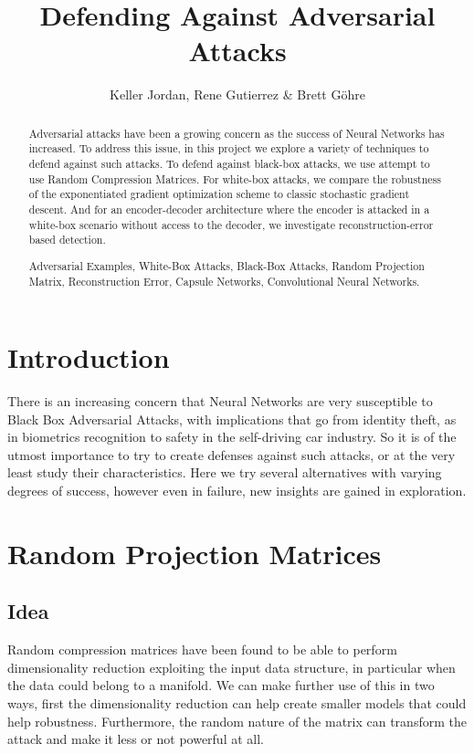 \documentclass{asaproc}
\title{Defending Against Adversarial Attacks}
\author{Keller Jordan, Rene Gutierrez \& Brett G\"{o}hre \\}
\begin{document}
\maketitle


\begin{abstract}

Adversarial attacks have been a growing concern as the success of Neural Networks has increased. To address this issue, in this project we explore a variety of techniques to defend against such attacks. To defend against black-box attacks, we use attempt to use Random Compression Matrices. For white-box attacks, we compare the robustness of the exponentiated gradient optimization scheme to classic stochastic gradient descent. And for an encoder-decoder architecture where the encoder is attacked in a white-box scenario without access to the decoder, we investigate reconstruction-error based detection.
	
\begin{keywords}
Adversarial Examples, White-Box Attacks, Black-Box Attacks, Random Projection Matrix, Reconstruction Error, Capsule Networks, Convolutional Neural Networks.
\end{keywords}
\end{abstract}


\section{Introduction}

There is an increasing concern that Neural Networks are very susceptible to Black Box Adversarial Attacks, with implications that go from identity theft, as in biometrics recognition to safety in the self-driving car industry. So it is of the utmost importance to try to create defenses against such attacks, or at the very least study their characteristics. Here we try several alternatives with varying degrees of success, however even in failure, new insights are gained in exploration.

\section{Random Projection Matrices}

\subsection*{Idea}

Random compression matrices have been found to be able to perform dimensionality reduction exploiting the input data structure, in particular when the data could belong to a manifold. We can make further use of this in two ways, first the dimensionality reduction can help create smaller models that could help robustness. Furthermore, the random nature of the matrix can transform the attack and make it less or not powerful at all.
\end{document}
